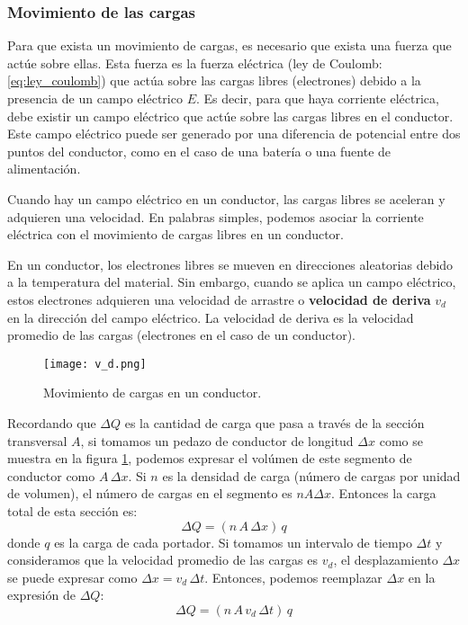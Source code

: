 \subsubsection{Movimiento de las cargas}

Para que exista un movimiento de cargas, es necesario que exista una fuerza que actúe sobre ellas. Esta fuerza es la fuerza eléctrica (ley de Coulomb: \ref{eq:ley_coulomb}) que actúa sobre las cargas libres (electrones) debido a la presencia de un campo eléctrico \(E\). Es decir, para que haya corriente eléctrica, debe existir un campo eléctrico que actúe sobre las cargas libres en el conductor. Este campo eléctrico puede ser generado por una diferencia de potencial entre dos puntos del conductor, como en el caso de una batería o una fuente de alimentación.

Cuando hay un campo eléctrico en un conductor, las cargas libres se aceleran y adquieren una velocidad. En palabras simples, podemos asociar la corriente eléctrica con el movimiento de cargas libres en un conductor.

En un conductor, los electrones libres se mueven en direcciones aleatorias debido a la temperatura del material. Sin embargo, cuando se aplica un campo eléctrico, estos electrones adquieren una velocidad de arrastre o \textbf{velocidad de deriva} \(v_d\) en la dirección del campo eléctrico. La velocidad de deriva es la velocidad promedio de las cargas (electrones en el caso de un conductor).

\begin{figure}[ht]
    \centering
    \texttt{[image: v\_d.png]}
    \caption{Movimiento de cargas en un conductor.}
    \label{fig:movimiento_de_cargas_en_un_conductor}
\end{figure}

Recordando que \(\Delta Q\) es la cantidad de carga que pasa a través de la sección transversal \(A\), si tomamos un pedazo de conductor de longitud \(\Delta x\) como se muestra en la figura \ref{fig:movimiento_de_cargas_en_un_conductor}, podemos expresar el volúmen de este segmento de conductor como \(A \, \Delta x\). Si \(n\) es la densidad de carga (número de cargas por unidad de volumen), el número de cargas en el segmento es \(n A \Delta x\). Entonces la carga total de esta sección es:
\[
    \Delta Q = (n \, A \, \Delta x) \, q
\]
donde \(q\) es la carga de cada portador. Si tomamos un intervalo de tiempo \(\Delta t\) y consideramos que la velocidad promedio de las cargas es \(v_d\), el desplazamiento \(\Delta x\) se puede expresar como \(\Delta x = v_d \, \Delta t\). Entonces, podemos reemplazar \(\Delta x\) en la expresión de \(\Delta Q\):
\[
    \Delta Q = (n \, A \, v_d \, \Delta t) \, q
\]

